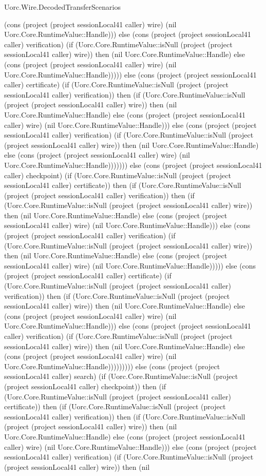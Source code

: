 \begin{lexlean}{Uorc.Wire.DecodedTransferScenarios}
\begin{semanticmodule}
{(cons (project (project sessionLocal41 caller) wire) (nil Uorc.Core.RuntimeValue::Handle))) else (cons (project (project sessionLocal41 caller) verification) (if (Uorc.Core.RuntimeValue::isNull (project (project sessionLocal41 caller) wire)) then (nil Uorc.Core.RuntimeValue::Handle) else (cons (project (project sessionLocal41 caller) wire) (nil Uorc.Core.RuntimeValue::Handle))))) else (cons (project (project sessionLocal41 caller) certificate) (if (Uorc.Core.RuntimeValue::isNull (project (project sessionLocal41 caller) verification)) then (if (Uorc.Core.RuntimeValue::isNull (project (project sessionLocal41 caller) wire)) then (nil Uorc.Core.RuntimeValue::Handle) else (cons (project (project sessionLocal41 caller) wire) (nil Uorc.Core.RuntimeValue::Handle))) else (cons (project (project sessionLocal41 caller) verification) (if (Uorc.Core.RuntimeValue::isNull (project (project sessionLocal41 caller) wire)) then (nil Uorc.Core.RuntimeValue::Handle) else (cons (project (project sessionLocal41 caller) wire) (nil Uorc.Core.RuntimeValue::Handle))))))) else (cons (project (project sessionLocal41 caller) checkpoint) (if (Uorc.Core.RuntimeValue::isNull (project (project sessionLocal41 caller) certificate)) then (if (Uorc.Core.RuntimeValue::isNull (project (project sessionLocal41 caller) verification)) then (if (Uorc.Core.RuntimeValue::isNull (project (project sessionLocal41 caller) wire)) then (nil Uorc.Core.RuntimeValue::Handle) else (cons (project (project sessionLocal41 caller) wire) (nil Uorc.Core.RuntimeValue::Handle))) else (cons (project (project sessionLocal41 caller) verification) (if (Uorc.Core.RuntimeValue::isNull (project (project sessionLocal41 caller) wire)) then (nil Uorc.Core.RuntimeValue::Handle) else (cons (project (project sessionLocal41 caller) wire) (nil Uorc.Core.RuntimeValue::Handle))))) else (cons (project (project sessionLocal41 caller) certificate) (if (Uorc.Core.RuntimeValue::isNull (project (project sessionLocal41 caller) verification)) then (if (Uorc.Core.RuntimeValue::isNull (project (project sessionLocal41 caller) wire)) then (nil Uorc.Core.RuntimeValue::Handle) else (cons (project (project sessionLocal41 caller) wire) (nil Uorc.Core.RuntimeValue::Handle))) else (cons (project (project sessionLocal41 caller) verification) (if (Uorc.Core.RuntimeValue::isNull (project (project sessionLocal41 caller) wire)) then (nil Uorc.Core.RuntimeValue::Handle) else (cons (project (project sessionLocal41 caller) wire) (nil Uorc.Core.RuntimeValue::Handle))))))))) else (cons (project (project sessionLocal41 caller) search) (if (Uorc.Core.RuntimeValue::isNull (project (project sessionLocal41 caller) checkpoint)) then (if (Uorc.Core.RuntimeValue::isNull (project (project sessionLocal41 caller) certificate)) then (if (Uorc.Core.RuntimeValue::isNull (project (project sessionLocal41 caller) verification)) then (if (Uorc.Core.RuntimeValue::isNull (project (project sessionLocal41 caller) wire)) then (nil Uorc.Core.RuntimeValue::Handle) else (cons (project (project sessionLocal41 caller) wire) (nil Uorc.Core.RuntimeValue::Handle))) else (cons (project (project sessionLocal41 caller) verification) (if (Uorc.Core.RuntimeValue::isNull (project (project sessionLocal41 caller) wire)) then (nil }
\end{semanticmodule}
\end{lexlean}
